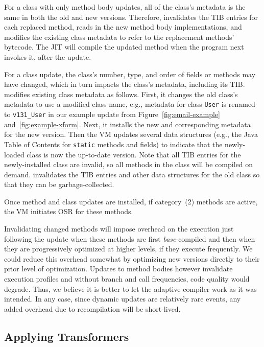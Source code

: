 For a class with only method body updates, all of the class's metadata
is the same in both the old and new versions.  Therefore, \DSU{} invalidates the TIB entries for each replaced method, 
reads in the new method body implementations, and modifies the
existing class metadata to refer to the replacement methods' bytecode.  The JIT
will compile the updated method when the program next invokes it, after the
update.

For a class update, the class's number, type, and order of fields or
methods may have changed, which in turn impacts the class's metadata,
including its TIB\@.  \DSU{} modifies existing class metadata as
follows.  First, it changes the old class's metadata to use a
modified class name, e.g., metadata for class \texttt{User} is renamed
to \texttt{v131\_User} in our example update from
Figure~\ref{fig:email-example} and~\ref{fig:example-xform}.  Next, it
installs the new \VMClass{} and corresponding metadata
for the new version. Then the VM updates several \JikesRVM{} data
structures (e.g., the Java Table of Contents for
{\tt static} methods and fields) to indicate that the newly-loaded
class is now the up-to-date version.  Note that all TIB entries for
the newly-installed class are invalid, so all methods in the class
will be compiled on demand.  \DSU{}  invalidates the
TIB entries and other data structures for the old class so that they
can be garbage-collected.  

Once method and class updates are installed, if category~(2) methods are
active, the VM initiates OSR for these methods. 

Invalidating changed methods will impose overhead on the execution
just following the update when these methods are first
\emph{base}-compiled and then when they are progressively optimized at
higher levels, if they execute frequently.  We could reduce this
overhead somewhat by optimizing new versions directly to their prior
level of optimization.  Updates to method bodies however invalidate
execution profiles and  without branch and call frequencies, code quality
would degrade. Thus, we believe it is better to let the adaptive
compiler work as it was intended.  In any case, since dynamic updates
are relatively rare events, any added overhead due to recompilation
will be short-lived.

\subsection{Applying Transformers}
\label{sec:xformers}


